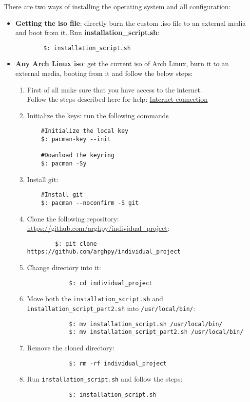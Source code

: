 \documentclass{article}
\begin{document}
There are two ways of installing the operating system and all configuration:
\begin{itemize}
	\item \textbf{Getting the iso file}: directly burn the custom .iso file to an external media and boot from it. Run \textbf{installation\_script.sh}:
	\begin{lstlisting}
		$: installation_script.sh
	\end{lstlisting}
	\item \textbf{Any Arch Linux iso}: get the current iso of Arch Linux, burn it to an external media, booting from it and follow the below steps:
	\begin{enumerate}
		\item First of all make sure that you have access to the internet.\\
		Follow the steps described here for help: \href{https://wiki.archlinux.org/title/Installation_guide#Connect_to_the_internet}{Internet connection}
		\item Initialize the keys: run the following commands
		\lstset{language=bash}
		\begin{lstlisting}
	#Initialize the local key
	$: pacman-key --init

	#Download the keyring
	$: pacman -Sy
		\end{lstlisting}
		\item Install git:
		\begin{lstlisting}
	#Install git
	$: pacman --noconfirm -S git		
		\end{lstlisting}
		
		\item Clone the following repository: \href{https://github.com/arghpy/individual_project}{https://github.com/arghpy/individual\_project}:
		\begin{lstlisting}
		$: git clone https://github.com/arghpy/individual_project
		\end{lstlisting}
		\lstset{language=C}
		\item Change directory into it:
		\begin{lstlisting}
			$: cd individual_project
		\end{lstlisting}
		\item Move both the \texttt{installation\_script.sh} and \texttt{installation\_script\_part2.sh} into \texttt{/usr/local/bin/}:
		\begin{lstlisting}
			$: mv installation_script.sh /usr/local/bin/
			$: mv installation_script_part2.sh /usr/local/bin/
		\end{lstlisting}
		\item Remove the cloned directory:
		\begin{lstlisting}
			$: rm -rf individual_project
		\end{lstlisting}
		\item Run \texttt{installation\_script.sh} and follow the steps:
		\begin{lstlisting}
			$: installation_script.sh
		\end{lstlisting}
	\end{enumerate}
\end{itemize}
\end{document}
